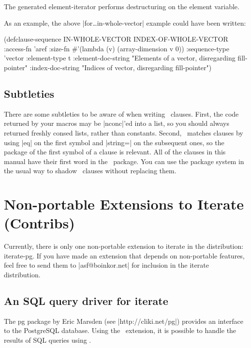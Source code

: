 \begin{clauses}
\cpar The generated element-iterator performs destructuring on the
element variable.

\cpar As an example, the above |for\dots in-whole-vector| example
could have been written:
\begin{program}
(defclause-sequence IN-WHOLE-VECTOR INDEX-OF-WHOLE-VECTOR
  :access-fn 'aref
  :size-fn \#'(lambda (v) (array-dimension v 0))
  :sequence-type 'vector
  :element-type t
  :element-doc-string 
     "Elements of a vector, disregarding fill-pointer"
  :index-doc-string 
     "Indices of vector, disregarding fill-pointer")
\end{program}

\end{clauses}

\subsection{Subtleties}

There are some subtleties to be aware of when writing \iter\ clauses.
First, the code returned by your macros may be |nconc|'ed into a list,
so you should always returned freshly consed lists, rather than
constants.  Second, \iter\ matches clauses by using |eq| on the first
symbol and |string=| on the subsequent ones, so the package of the
first symbol of a clause is relevant.  All of the clauses in this manual
have their first word in the \iter\ package.  
You can use the package system in the usual way to shadow
\iter\ clauses without replacing them.


\section{Non-portable Extensions to Iterate (Contribs)}
\label{contribs}

Currently, there is only one non-portable extension to iterate in the
distribution: iterate-pg. If you have made an extension that depends
on non-portable features, feel free to send them to |asf@boinkor.net|
for inclusion in the iterate distribution.

\subsection{An SQL query driver for iterate}

The pg package by Eric Marsden (see |http://cliki.net/pg|) provides an
interface to the PostgreSQL database. Using the \iterpg\ extension, it
is possible to handle the results of SQL queries using \iter.

